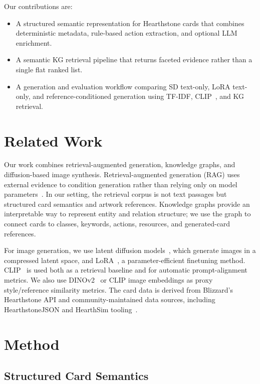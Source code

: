 \documentclass[10pt,twocolumn,letterpaper]{article}
\begin{document}
Our contributions are:
\begin{itemize}
\item A structured semantic representation for Hearthstone cards that combines deterministic metadata, rule-based action extraction, and optional LLM enrichment.
\item A semantic KG retrieval pipeline that returns faceted evidence rather than a single flat ranked list.
\item A generation and evaluation workflow comparing SD text-only, LoRA text-only, and reference-conditioned generation using TF-IDF, CLIP~\cite{radford2021clip}, and KG retrieval.
\end{itemize}

\section{Related Work}

Our work combines retrieval-augmented generation, knowledge graphs, and diffusion-based image synthesis. Retrieval-augmented generation (RAG) uses external evidence to condition generation rather than relying only on model parameters~\cite{lewis2020rag}. In our setting, the retrieval corpus is not text passages but structured card semantics and artwork references. Knowledge graphs provide an interpretable way to represent entity and relation structure; we use the graph to connect cards to classes, keywords, actions, resources, and generated-card references.

For image generation, we use latent diffusion models~\cite{rombach2022ldm}, which generate images in a compressed latent space, and LoRA~\cite{hu2021lora}, a parameter-efficient finetuning method. CLIP~\cite{radford2021clip} is used both as a retrieval baseline and for automatic prompt-alignment metrics. We also use DINOv2~\cite{oquab2023dinov2} or CLIP image embeddings as proxy style/reference similarity metrics. The card data is derived from Blizzard's Hearthstone API and community-maintained data sources, including HearthstoneJSON and HearthSim tooling~\cite{hearthstoneapi,hearthstonejson,hearthsim}.

\section{Method}

\subsection{Structured Card Semantics}
\end{document}
